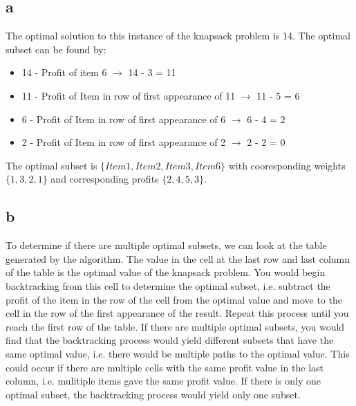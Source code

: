 \documentclass{article}
\begin{document}
\subsection*{a}
The optimal solution to this instance of the knapsack problem is 14. The optimal subset can be found by:
\begin{itemize}
    \item 14 - Profit of item 6 $\rightarrow$ 14 - 3 = 11
    \item 11 - Profit of Item in row of first appearance of 11 $\rightarrow$ 11 - 5 = 6
    \item 6 - Profit of Item in row of first appearance of 6 $\rightarrow$ 6 - 4 = 2
    \item 2 - Profit of Item in row of first appearance of 2 $\rightarrow$ 2 - 2 = 0
\end{itemize}
The optimal subset is $\{Item 1, Item 2, Item 3, Item 6\}$ with cooresponding weights $\{1, 3, 2, 1\}$
and corresponding profits $\{2, 4, 5, 3\}$.

\subsection*{b}
To determine if there are multiple optimal subsets,
we can look at the table generated by the algorithm.
The value in the cell at the last row and last column of the table
is the optimal value of the knapsack problem. You would begin
backtracking from this cell to determine the optimal subset, i.e.
subtract the profit of the item in the row of the cell from the optimal value
and move to the cell in the row of the first appearance of the result.
Repeat this process until you reach the first row of the table.
If there are multiple optimal subsets, you would find that the
backtracking process would yield different subsets that have the same
optimal value, i.e. there would be multiple paths to the optimal value.
This could occur if there are multiple cells with the same profit value in the last column, i.e. mulitiple items
gave the same profit value. If there is only one optimal subset, the backtracking
process would yield only one subset.
\end{document}
